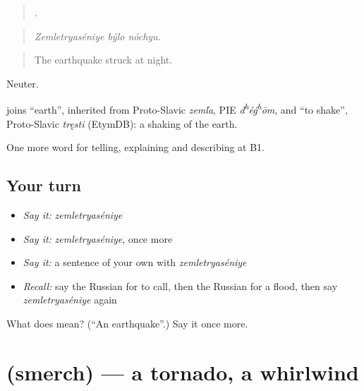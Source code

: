 \begin{quote}
  .
\end{quote}

\begin{quote}
\emph{Zemletryaséniye býlo nóchyu.}
\end{quote}

\begin{quote}
The earthquake struck at night.
\end{quote}

Neuter.

\begin{cousinweb}
\emph{} joins \emph{} \textquotedblleft{}earth\textquotedblright{}, inherited from Proto-Slavic \emph{zemľa}, PIE \emph{d\textsuperscript{h}éǵ\textsuperscript{h}ōm}, and \emph{} \textquotedblleft{}to shake\textquotedblright{}, Proto-Slavic \emph{tręsti} (EtymDB): a shaking of the earth.
\end{cousinweb}

\begin{grammarlens}[title={What you've built}]
One more word for telling, explaining and describing at B1.
\end{grammarlens}

\subsection*{Your turn}
\begin{itemize}
\raggedright
  \item \emph{Say it:} \emph{zemletryaséniye}
  \item \emph{Say it:} \emph{zemletryaséniye}, once more
  \item \emph{Say it:} a sentence of your own with \emph{zemletryaséniye}
  \item \emph{Recall:} say the Russian for to call, then the Russian for a flood, then say \emph{zemletryaséniye} again
\end{itemize}

\begin{tcolorbox}[breakable,colback=teal!4,colframe=teal!35!black,title={Before you move on}]
What does  mean? (\textquotedblleft{}An earthquake\textquotedblright{}.) Say it once more.
\end{tcolorbox}
\section[\texorpdfstring{\ru{смерч} (smerch)}{смерч (smerch)}]{ (smerch) — a tornado, a whirlwind}

